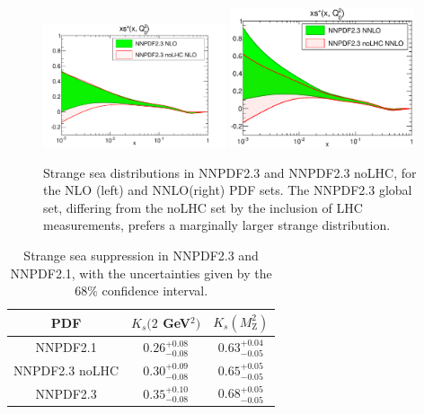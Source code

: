 \begin{figure}[h!]
\centering
\includegraphics[width=0.48\textwidth]{6-LHCimpact/figs/xsp_Q_2_log-23-vs-23noLHC-nlo.eps}
\includegraphics[width=0.48\textwidth]{6-LHCimpact/figs/xsp_Q_2_log-23-vs-23noLHC-nnlo.eps}
\caption[Strange sea distributions in NNPDF2.3 and NNPDF2.3 noLHC]{Strange sea distributions in NNPDF2.3 and NNPDF2.3 noLHC, for the NLO (left) and NNLO(right) PDF sets. The NNPDF2.3 global set, differing from the noLHC set by the inclusion of LHC measurements, prefers a marginally larger strange distribution.}
\label{fig:23noLHCvs23_strangeness}
\end{figure}
\clearpage

\begin{table}[htb]
\begin{center}
\begin{tabular}{|c|c|c|}
\hline
PDF	& $K_s(2$ GeV$^2)$ & $K_s(M_{\text{Z}}^2)$ \\
\hline
NNPDF2.1 & $0.26^{+0.08}_{-0.08}$ & $0.63^{+0.04}_{-0.05}$ \\
NNPDF2.3 noLHC & $0.30^{+0.09}_{-0.08}$ & $0.65^{+0.05}_{-0.05}$ \\
NNPDF2.3 & $0.35^{+0.10}_{-0.08}$ & $0.68^{+0.05}_{-0.05}$ \\
\hline
\end{tabular}
\caption[Strange sea suppression in NNPDF2.3 and NNPDF2.1 NNLO]{Strange sea suppression in NNPDF2.3 and NNPDF2.1, with the uncertainties given by the 68\% confidence interval. }
\label{tab:strangesupp}
\end{center}
\end{table}%

